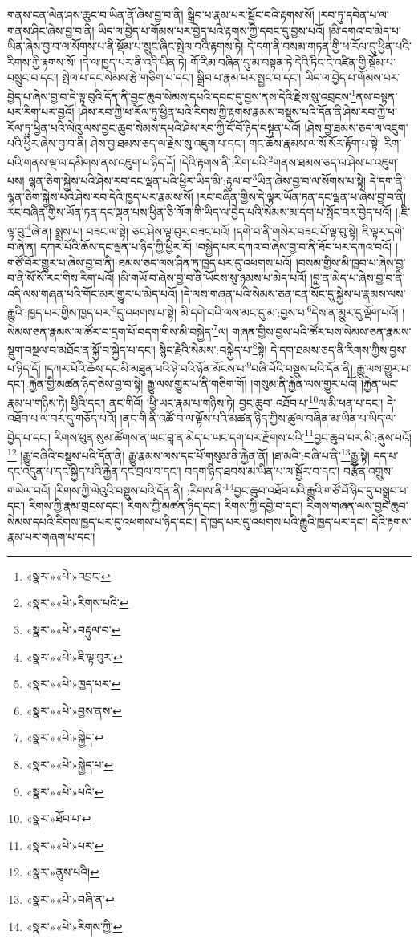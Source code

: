 གནས་ངན་ལེན་ཤས་ཆུང་བ་ཡིན་ནོ་ཞེས་བྱ་བ་ནི། སྒྲིབ་པ་རྣམ་པར་སྦྱོང་བའི་རྟགས་སོ། །རབ་ཏུ་དབེན་པ་ལ་གནས་ཤིང་ཞེས་བྱ་བ་ནི། ཡིད་ལ་བྱེད་པ་གོམས་པར་བྱེད་པའི་རྟགས་ཀྱི་དབང་དུ་བྱས་པའོ། །མི་དགའ་བ་མེད་པ་ཡིན་ཞེས་བྱ་བ་ལ་སོགས་པ་ནི་སྡོམ་པ་སྲུང་ཞིང་སྤེལ་བའི་རྟགས་ཏེ། དེ་དག་ནི་བསམ་གཏན་གྱི་ཕ་རོལ་དུ་ཕྱིན་པའི་རིགས་ཀྱི་རྟགས་སོ། །དེ་ལ་ཁྱད་པར་ནི་འདི་ཡིན་ཏེ། གོ་རིམ་བཞིན་དུ་མ་བསྟན་ཏེ་དེའི་ཏིང་ངེ་འཛིན་གྱི་སྡོམ་པ་བསྲུང་བ་དང་། སྤེལ་པ་དང་སེམས་རྩེ་གཅིག་པ་དང་། སྒྲིབ་པ་རྣམ་པར་སྦྱང་བ་དང་། ཡིད་ལ་བྱེད་པ་གོམས་པར་བྱེད་པ་ཞེས་བྱ་བ་དེ་ལྟ་བུའི་དོན་ནི་བྱང་ཆུབ་སེམས་དཔའི་དབང་དུ་བྱས་ནས་དེའི་རྗེས་སུ་འབྲངས་\footnote{«སྣར་»«པེ་»འབྲང་}ནས་བསྟན་པར་རིག་པར་བྱའོ། །ཤེས་རབ་ཀྱི་ཕ་རོལ་ཏུ་ཕྱིན་པའི་རིགས་ཀྱི་རྟགས་རྣམས་བསྡུས་པའི་དོན་ནི་ཤེས་རབ་ཀྱི་ཕ་རོལ་ཏུ་ཕྱིན་པའི་ལེའུ་ལས་བྱང་ཆུབ་སེམས་དཔའི་ཤེས་རབ་ཀྱི་ངོ་བོ་ཉིད་བསྟན་པའོ། །ཤེས་བྱ་ཐམས་ཅད་ལ་འཇུག་པའི་ཕྱིར་ཞེས་བྱ་བ་ནི། ཤེས་བྱ་ཐམས་ཅད་ལ་རྗེས་སུ་འཇུག་པ་དང་། གང་ཆོས་རྣམས་ལ་སོ་སོར་རྟོག་པ་སྟེ། རིག་པའི་གནས་ལྔ་ལ་དམིགས་ནས་འཇུག་པ་ཉིད་དོ། །དེའི་རྟགས་ནི་:རིག་པའི་\footnote{«སྣར་»«པེ་»རིགས་པའི་}གནས་ཐམས་ཅད་ལ་ཤེས་པ་འཇུག་པས། ལྷན་ཅིག་སྐྱེས་པའི་ཤེས་རབ་དང་ལྡན་པའི་ཕྱིར་ཡིད་མི་:རྟུལ་བ་\footnote{«སྣར་»«པེ་»བརྟུལ་བ་}ཡིན་ཞེས་བྱ་བ་ལ་སོགས་པ་སྟེ། དེ་དག་ནི་ལྷན་ཅིག་སྐྱེས་པའི་ཤེས་རབ་དེའི་ཁྱད་པར་རྣམས་སོ། །རང་བཞིན་གྱིས་དེ་ལྟར་ཡོན་ཏན་དང་ལྡན་པ་ཞེས་བྱ་བ་ནི། རང་བཞིན་གྱིས་ཡོན་ཏན་དང་ལྡན་པས་ཕྱིན་ཅི་ལོག་གི་ཡིད་ལ་བྱེད་པའི་སེམས་མ་དག་པ་སྤོང་བར་བྱེད་པའོ། །:ཇི་ལྟ་བུ་\footnote{«སྣར་»«པེ་»ཇི་ལྟ་བུར་}ཞེ་ན། སྨྲས་པ། བཟང་ལ་སྟེ། ཅང་ཤེས་ལྟ་བུར་བཟང་བའོ། །དགེ་བ་ནི་གསེར་བཟང་པོ་ལྟ་བུ་སྟེ། ཇི་ལྟར་དགེ་བ་ཞེ་ན། དཀར་པོའི་ཆོས་དང་ལྡན་པ་ཉིད་ཀྱི་ཕྱིར་རོ། །བསྐྱེད་པར་དཀའ་བ་ཞེས་བྱ་བ་ནི་ཐོབ་པར་དཀའ་བའོ། །གཙོ་བོར་གྱུར་པ་ཞེས་བྱ་བ་ནི། ཐམས་ཅད་ལས་ཤིན་ཏུ་ཁྱད་པར་དུ་འཕགས་པའོ། །བསམ་གྱིས་མི་ཁྱབ་པ་ཞེས་བྱ་བ་ནི་སོ་སོ་རང་གིས་རིག་པའོ། །མི་གཡོ་བ་ཞེས་བྱ་བ་ནི་ཡོངས་སུ་ཉམས་པ་མེད་པའོ། །བླ་ན་མེད་པ་ཞེས་བྱ་བ་ནི་འདི་ལས་གཞན་པའི་གོང་མར་གྱུར་པ་མེད་པའོ། །དེ་ལས་གཞན་པའི་སེམས་ཅན་ངན་སོང་དུ་སྐྱེས་པ་རྣམས་ལས་རྒྱུའི་:ཁྱད་པར་གྱིས་ཁྱད་པར་\footnote{«སྣར་»«པེ་»ཁྱད་པར་}དུ་འཕགས་པ་སྟེ། མི་དགེ་བའི་ལས་མང་དུ་མ་:བྱས་པ་\footnote{«སྣར་»«པེ་»བྱས་ནས་}དེས་ན་མྱུར་དུ་ལྡོག་པའོ། །སེམས་ཅན་རྣམས་ལ་ཚོར་བ་དྲག་པོ་བདག་གིས་མི་བསྐྱེད་\footnote{«སྣར་»«པེ་»སྐྱེད་}ལ། གཞན་གྱིས་བྱས་པའི་ཚོར་པས་སེམས་ཅན་རྣམས་སྡུག་བསྔལ་བ་མཐོང་ན་སྐྱོ་བ་སྐྱེད་པ་དང་། སྙིང་རྗེའི་སེམས་:བསྐྱེད་པ་\footnote{«སྣར་»«པེ་»སྐྱེད་པ་}སྟེ། དེ་དག་ཐམས་ཅད་ནི་རིགས་ཀྱིས་བྱས་པ་ཉིད་དོ། །དཀར་པོའི་ཆོས་དང་མི་མཐུན་པའི་ཉེ་བའི་ཉོན་མོངས་པ་\footnote{«སྣར་»«པེ་»པའི་}བཞི་པོའི་བསྡུས་པའི་དོན་ནི། རྒྱུ་ལས་གྱུར་པ་དང་། རྐྱེན་གྱི་མཚན་ཉིད་ཅེས་བྱ་བ་སྟེ། རྒྱུ་ལས་གྱུར་པ་ནི་གཅིག་གོ། །གསུམ་ནི་རྐྱེན་ལས་གྱུར་པའོ། །རྐྱེན་ཡང་རྣམ་པ་གཉིས་ཏེ། ཕྱིའི་དང་། ནང་གིའོ། །ཕྱི་ཡང་རྣམ་པ་གཉིས་ཏེ། བྱང་ཆུབ་:འཐོབ་པ་\footnote{«སྣར་»ཐོབ་པ་}ལ་མི་ཕན་པ་དང་། དེ་འཐོབ་པ་ལ་བར་དུ་གཅོད་པའོ། །ནང་གི་ནི་འཚོ་བ་ལ་ལྟོས་པའི་མཚན་ཉིད་ཀྱིས་ཚུལ་བཞིན་མ་ཡིན་པ་ཡིད་ལ་བྱེད་པ་དང་། རིགས་ཕུན་སུམ་ཚོགས་ན་ཡང་བླ་ན་མེད་པ་ཡང་དག་པར་རྫོགས་པའི་\footnote{«སྣར་»«པེ་»པར་}བྱང་ཆུབ་པར་མི་:ནུས་པའོ།\footnote{«སྣར་»ནུས་པའི།} །རྒྱུ་བཞིའི་བསྡུས་པའི་དོན་ནི། རྒྱུ་རྣམས་ལས་དང་པོ་གསུམ་ནི་རྐྱེན་ནོ། །ཐ་མའི་:བཞི་པ་ནི་\footnote{«སྣར་»«པེ་»བཞི་ན་}རྒྱུ་སྟེ། དད་པ་དང་འདུན་པ་དང་སྐྱེད་པའི་རྐྱེན་དང་བྲལ་བ་དང་། བདག་ཉིད་ཐབས་མ་ཡིན་པ་ལ་སྦྱོར་བ་དང་། བརྩོན་འགྲུས་གཡེལ་བའོ། །རིགས་ཀྱི་ལེའུའི་བསྡུས་པའི་དོན་ནི། :རིགས་ནི་\footnote{«སྣར་»«པེ་»རིགས་ཀྱི་}བྱང་ཆུབ་འཐོབ་པའི་རྒྱུའི་གཙོ་བོ་ཉིད་དུ་བསྒྲུབ་པ་དང་། རིགས་ཀྱི་རྣམ་གྲངས་དང་། རིགས་ཀྱི་མཚན་ཉིད་དང་། རིགས་ཀྱི་དབྱེ་བ་དང་། རིགས་གཞན་ལས་བྱང་ཆུབ་སེམས་དཔའི་རིགས་ཁྱད་པར་དུ་འཕགས་པ་ཉིད་དང་། དེ་ཁྱད་པར་དུ་འཕགས་པའི་རྒྱུའི་ཁྱད་པར་དང་། དེའི་རྟགས་རྣམ་པར་གཞག་པ་དང་། 